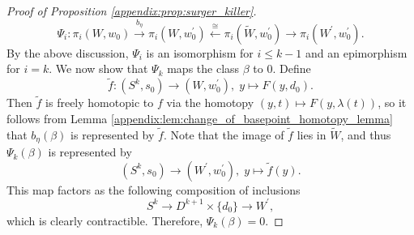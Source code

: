 \begin{proof}[Proof of Proposition \ref{appendix:prop:surger_killer}]
    \[
    \Psi_i \colon \pi_i(W,w_0) \xrightarrow{b_\eta} \pi_i(W,w_0^\prime) \xleftarrow{\cong} \pi_i(\tilde{W},w_0^\prime) \to \pi_i(W^\prime,w_0^\prime).
    \]
    By the above discussion, $\Psi_i$ is an isomorphism for $i \leq k-1$ and an epimorphism for $i = k$. We now show that $\Psi_k$ maps the class $\beta$ to $0$. Define
    \[
    \tilde{f} \colon (S^k,s_0) \to (W,w_0^\prime), \; y \mapsto F(y,d_0).
    \]
    Then $\tilde{f}$ is freely homotopic to $f$ via the homotopy $(y,t) \mapsto F(y,\lambda(t))$, so it follows from Lemma \ref{appendix:lem:change_of_basepoint_homotopy_lemma} that $b_\eta(\beta)$ is represented by $\tilde{f}$. Note that the image of $\tilde{f}$ lies in $\tilde{W}$, and thus $\Psi_k(\beta)$ is represented by
    \[
    (S^k,s_0) \to (W^\prime,w_0^\prime), \; y \mapsto \tilde{f}(y).
    \]
    This map factors as the following composition of inclusions
    \[
    S^k \to D^{k+1} \times \{d_0\} \to W^\prime,
    \]
    which is clearly contractible. Therefore, $\Psi_k(\beta) = 0$. 
    \vspace{.5em}


\end{proof}
